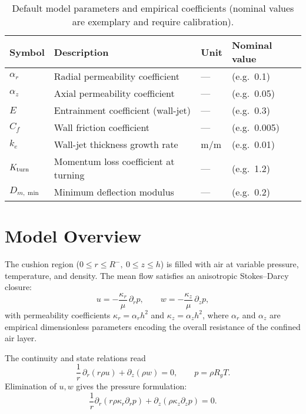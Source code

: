 \documentclass[11pt,a4paper]{article}
\begin{document}
\begin{table}[h]
  \centering
  \caption{Default model parameters and empirical coefficients (nominal values are exemplary and require calibration).}
  \label{tab:model-params}
  \begin{tabular}{@{}llll@{}}
    \toprule
    Symbol & Description & Unit & Nominal value \\
    \midrule
    $\alpha_r$     & Radial permeability coefficient      & —     & (e.g.\ 0.1) \\
    $\alpha_z$     & Axial permeability coefficient       & —     & (e.g.\ 0.05) \\
    $E$            & Entrainment coefficient (wall-jet)  & —     & (e.g.\ 0.3) \\
    $C_f$          & Wall friction coefficient           & —     & (e.g.\ 0.005) \\
    $k_e$          & Wall-jet thickness growth rate      & m/m   & (e.g.\ 0.01) \\
    $K_{\rm turn}$ & Momentum loss coefficient at turning& —     & (e.g.\ 1.2) \\
    $D_{m,\min}$   & Minimum deflection modulus         & —     & (e.g.\ 0.2) \\
    \bottomrule
  \end{tabular}
\end{table}

\section{Model Overview}
\label{sec:model-overview}

The cushion region ($0\le r\le R^{-},\ 0\le z\le h$) is filled with air at variable pressure, temperature, and density.
The mean flow satisfies an anisotropic Stokes--Darcy closure:
\begin{equation}
  u = -\frac{\kappa_r}{\mu}\,\partial_r p,\qquad
  w = -\frac{\kappa_z}{\mu}\,\partial_z p,
\end{equation}
with permeability coefficients $\kappa_r=\alpha_r h^2$ and $\kappa_z=\alpha_z h^2$, where $\alpha_r$ and $\alpha_z$ are empirical dimensionless parameters encoding the overall resistance of the confined air layer.

The continuity and state relations read
\begin{equation}
  \frac{1}{r}\,\partial_r\!\left(r\rho u\right)+\partial_z(\rho w)=0,\qquad
  p=\rho R_g T.
\end{equation}
Elimination of $u,w$ gives the pressure formulation:
\begin{equation}
  \frac{1}{r}\partial_r(r\rho\kappa_r\partial_r p)+\partial_z(\rho\kappa_z\partial_z p)=0.
\end{equation}
\end{document}
